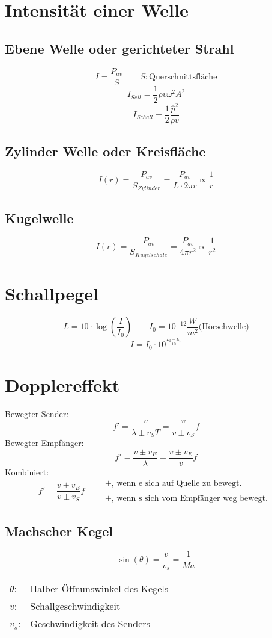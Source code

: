 \section{Intensität einer Welle}
\subsection{Ebene Welle oder gerichteter Strahl}
\[ \boxed{I = \frac{P_{av}}{S}} \qquad S: \text{Querschnittsfläche}\]
\[ \boxed{I_{Seil} = \frac{1}{2} \rho v \omega^2 A^2} \]
\[ \boxed{I_{Schall} = \frac{1}{2} \frac{\hat{p}^2}{\rho v}} \]
\subsection{Zylinder Welle oder Kreisfläche}
\[ \boxed{I(r) = \frac{P_{av}}{S_{Zylinder}} = \frac{P_{av}}{L \cdot 2 \pi r} 
\propto \frac{1}{r}} \]
\subsection{Kugelwelle}
\[ \boxed{I(r) = \frac{P_{av}}{S_{Kugelschale}} = \frac{P_{av}}{4 \pi r^2} 
\propto \frac{1}{r^2}} \]

\section{Schallpegel}
\[ \boxed{L = 10 \cdot \log\left(\frac{I}{I_0}\right)} 
\qquad I_0 = 10^{-12} \frac{W}{m^2} \text{(Hörschwelle)} \]
\[ \boxed{I = I_0 \cdot 10^{\frac{L_2 - L_1}{10}}} \]

\section{Dopplereffekt}
Bewegter Sender: 
\[ \boxed{f' = \frac{v}{\lambda \pm v_S T} = \frac{v}{v \pm v_S}f} \]
Bewegter Empfänger: 
\[ \boxed{f' = \frac{v \pm v_E}{\lambda} = \frac{v \pm v_E}{v}f} \]
Kombiniert: 
\[ \boxed{f' = \frac{v \pm v_E}{v \pm v_S}f} \qquad \substack{\text{
$+$, wenn e sich auf Quelle zu bewegt. }\\\\\text{
$+$, wenn s sich vom Empfänger weg bewegt. }} \]

\subsection{Machscher Kegel}
\[ \boxed{\sin(\theta) = \frac{v}{v_s} = \frac{1}{Ma}} \]
\begin{tabular}{l@{}l}
$\theta$:   & Halber Öffnunswinkel des Kegels \\
$v$:        & Schallgeschwindigkeit \\
$v_s$:      & Geschwindigkeit des Senders
\end{tabular}

